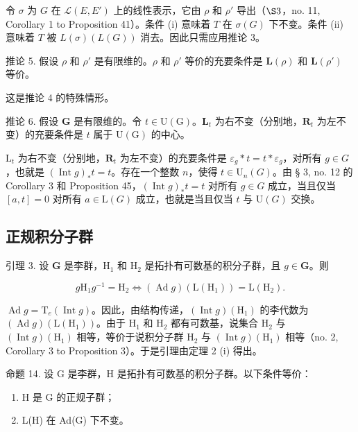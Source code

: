 令 \(\sigma\) 为 \(G\) 在 \(\mathcal{L}(E, E')\) 上的线性表示，它由 \(\rho\) 和 \(\rho'\) 导出（\(\S 3\)，no. 11, Corollary 1 to Proposition 41）。条件 (i) 意味着 \(T\) 在 \(\sigma(G)\) 下不变。条件 (ii) 意味着 \(T\) 被 \(L(\sigma)(L(G))\) 消去。因此只需应用推论 3。

推论 5. 假设 \(\rho\) 和 \(\rho'\) 是有限维的。\(\rho\) 和 \(\rho'\) 等价的充要条件是 \(\mathbf{L}(\rho)\) 和 \(\mathbf{L}(\rho')\) 等价。

这是推论 4 的特殊情形。

推论 6. 假设 \(\mathbf{G}\) 是有限维的。令 \(t \in \mathrm{U}(\mathrm{G})\)。\(\mathbf{L}_t\) 为右不变（分别地，\(\mathbf{R}_t\) 为左不变）的充要条件是 \(t\) 属于 \(\mathrm{U}(\mathrm{G})\) 的中心。

\(\mathrm{L}_t\) 为右不变（分别地，\(\mathbf{R}_t\) 为左不变）的充要条件是 \(\varepsilon_g * t = t * \varepsilon_g\)，对所有 \(g \in G\)，也就是 \((\operatorname{Int} g)_* t = t\)。存在一个整数 \(n\)，使得 \(t \in \mathrm{U}_n(G)\)。由 § 3, no. 12 的 Corollary 3 和 Proposition 45，\((\operatorname{Int} g)_* t = t\) 对所有 \(g \in G\) 成立，当且仅当 \([a, t] = 0\) 对所有 \(a \in \mathrm{L}(G)\) 成立，也就是当且仅当 \(t\) 与 \(\mathrm{U}(G)\) 交换。

\subsection{正规积分子群}

引理 3. 设 \(\mathbf{G}\) 是李群，\(\mathrm{H}_1\) 和 \(\mathrm{H}_2\) 是拓扑有可数基的积分子群，且 \(g \in \mathbf{G}\)。则

\[
g \mathrm{H} _ {1} g ^ {- 1} = \mathrm{H} _ {2} \Leftrightarrow (\operatorname{Ad} g) (\mathrm{L} (\mathrm{H} _ {1})) = \mathrm{L} (\mathrm{H} _ {2}).
\]

\(\operatorname{Ad} g = \mathrm{T}_{e}(\operatorname{Int} g)\)。因此，由结构传递，\((\operatorname{Int} g)(\mathrm{H}_{1})\) 的李代数为 \((\operatorname{Ad} g)(\mathrm{L}(\mathrm{H}_{1}))\)。由于 \(\mathrm{H}_{1}\) 和 \(\mathrm{H}_{2}\) 都有可数基，说集合 \(\mathrm{H}_{2}\) 与 \((\operatorname{Int} g)(\mathrm{H}_{1})\) 相等，等价于说积分子群 \(\mathrm{H}_{2}\) 与 \((\operatorname{Int} g)(\mathrm{H}_{1})\) 相等（no. 2, Corollary 3 to Proposition 3）。于是引理由定理 2 (i) 得出。

命题 14. 设 G 是李群，H 是拓扑有可数基的积分子群。以下条件等价：

\begin{enumerate}
\def\labelenumi{(\roman{enumi})}
\item
  H 是 G 的正规子群；
\item
  L(H) 在 Ad(G) 下不变。
\end{enumerate}

